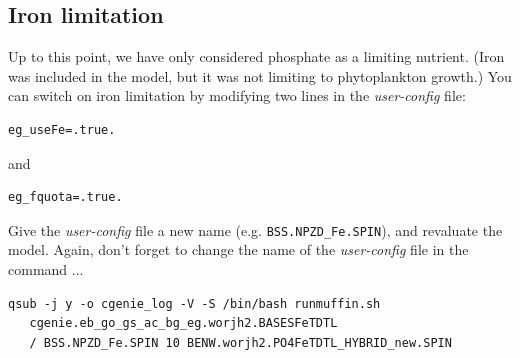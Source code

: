 \documentclass[11pt,fleqn]{book} %
\begin{document}

\subsection{Iron limitation} 

Up to this point, we have only considered phosphate as a limiting nutrient. (Iron was included in the model, but it was not limiting to phytoplankton growth.) You can switch on iron limitation by modifying two lines in the \textit{user-config} file:
\begin{verbatim}
eg_useFe=.true.
\end{verbatim}
and
\begin{verbatim}
eg_fquota=.true.
\end{verbatim}

Give the \textit{user-config} file a new name (e.g. \texttt{BSS.NPZD\_Fe.SPIN}), and revaluate the model. Again, don't forget to change the name of the \textit{user-config} file in the command ...

\small\begin{verbatim}
qsub -j y -o cgenie_log -V -S /bin/bash runmuffin.sh 
   cgenie.eb_go_gs_ac_bg_eg.worjh2.BASESFeTDTL
   / BSS.NPZD_Fe.SPIN 10 BENW.worjh2.PO4FeTDTL_HYBRID_new.SPIN
\end{verbatim}\normalsize
\end{document}
